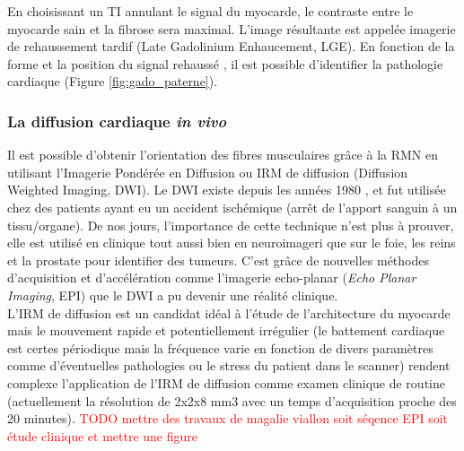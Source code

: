 En choisissant un TI annulant le signal du myocarde, le contraste entre le myocarde sain et la fibrose sera maximal. L’image résultante est appelée imagerie de rehaussement tardif (Late Gadolinium Enhaucement, LGE). En fonction de la forme et la position du signal rehaussé  \cite{Barison2022-ok}, il est possible d’identifier la pathologie cardiaque (Figure \ref{fig:gado_paterne}).




\subsubsection{La diffusion cardiaque \textit{in vivo} 
}
Il est possible d’obtenir l’orientation des fibres musculaires grâce à la RMN en utilisant l’Imagerie Pondérée en Diffusion ou IRM de diffusion (Diffusion Weighted Imaging, DWI). Le DWI existe depuis les années 1980 \cite{LeBihan1986}, et fut utilisée chez des patients ayant eu un accident ischémique (arrêt de l’apport sanguin à un tissu/organe). De nos jours, l’importance de cette technique n’est plus à prouver, elle est utilisé en clinique tout aussi bien en neuroimageri que sur le foie, les reins et la prostate pour identifier des tumeurs. C’est grâce de nouvelles méthodes d’acquisition et d’accélération comme l’imagerie echo-planar (\textit{Echo Planar Imaging}, EPI) \cite{Mansfield1977} \cite{PoustchiAmin2001} que le DWI a pu devenir une réalité clinique. \\ %


L’IRM de diffusion est un candidat idéal à l’étude de l’architecture du myocarde mais le mouvement rapide et potentiellement irrégulier (le battement cardiaque est certes périodique mais la fréquence varie en fonction de divers paramètres comme d’éventuelles pathologies ou le stress du patient dans le scanner) rendent complexe l’application de l’IRM de diffusion comme examen clinique de routine (actuellement la résolution de 2x2x8 mm3 avec un temps d’acquisition proche des 20 minutes). \textcolor{red}{TODO mettre des travaux de magalie viallon soit séqence EPI soit étude clinique et mettre une figure }\\




